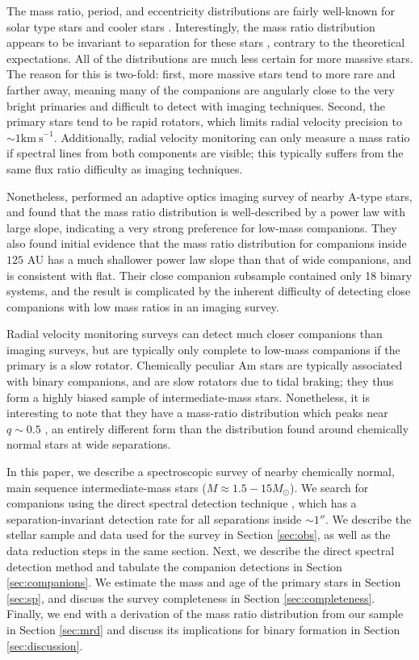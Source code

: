 \documentclass{emulateapj}
\begin{document}
The mass ratio, period, and eccentricity distributions are fairly well-known for solar type stars \citep{Duquennoy1991, Raghavan2010} and cooler stars \citep{Fischer1992, Delfosse2004}. Interestingly, the mass ratio distribution appears to be invariant to separation for these stars \citep{Meyer2013}, contrary to the theoretical expectations. All of the distributions are much less certain for more massive stars. The reason for this is two-fold: first, more massive stars tend to more rare and farther away, meaning many of the companions are angularly close to the very bright primaries and difficult to detect with imaging techniques. Second, the primary stars tend to be rapid rotators, which limits radial velocity precision to $\sim 1 \mathrm{km\ s}^{-1}$. Additionally, radial velocity monitoring can only measure a mass ratio if spectral lines from both components are visible; this typically suffers from the same flux ratio difficulty as imaging techniques. 

Nonetheless, \citet{DeRosa2014} performed an adaptive optics imaging survey of nearby A-type stars, and found that the mass ratio distribution is well-described by a power law with large slope, indicating a very strong preference for low-mass companions. They also found initial evidence that the mass ratio distribution for companions inside $125$ AU has a much shallower power law slope than that of wide companions, and is consistent with flat. Their close companion subsample contained only 18 binary systems, and the result is complicated by the inherent difficulty of detecting close companions with low mass ratios in an imaging survey. 

Radial velocity monitoring surveys can detect much closer companions than imaging surveys, but are typically only complete to low-mass companions if the primary is a slow rotator. Chemically peculiar Am stars are typically associated with binary companions, and are slow rotators due to tidal braking; they thus form a highly biased sample of intermediate-mass stars. Nonetheless, it is interesting to note that they have a mass-ratio distribution which peaks near $q \sim 0.5$ \citep{Vuissoz2004}, an entirely different form than the distribution found around chemically normal stars at wide separations.

In this paper, we describe a spectroscopic survey of nearby chemically normal, main sequence intermediate-mass stars ($M \approx 1.5 - 15 M_{\odot}$). We search for companions using the direct spectral detection technique \citep{Gullikson2016}, which has a separation-invariant detection rate for all separations inside $\sim 1 ''$. We describe the stellar sample and data used for the survey in Section \ref{sec:obs}, as well as the data reduction steps in the same section. Next, we describe the direct spectral detection method and tabulate the companion detections in Section \ref{sec:companions}. We estimate the mass and age of the primary stars in Section \ref{sec:sp}, and discuss the survey completeness in Section \ref{sec:completeness}. Finally, we end with a derivation of the mass ratio distribution from our sample in Section \ref{sec:mrd} and discuss its implications for binary formation in Section \ref{sec:discussion}.
 
\end{document}
